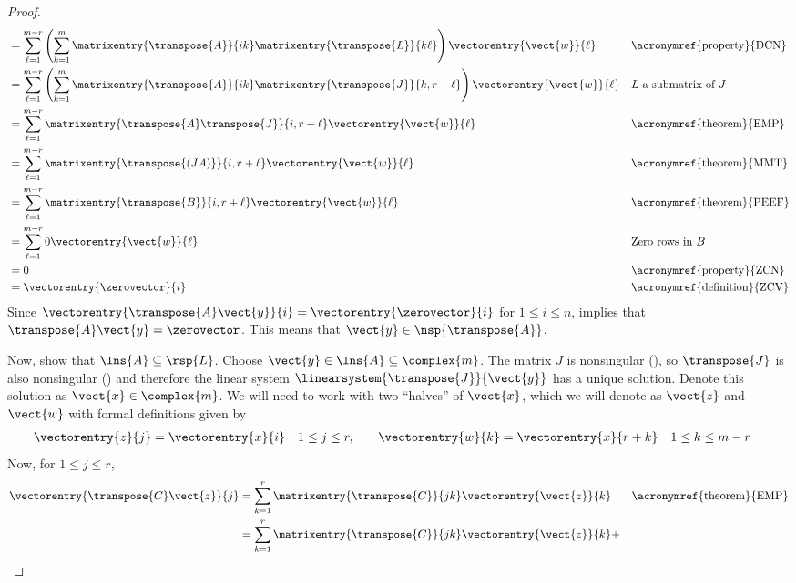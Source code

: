 \begin{proof}
\begin{align*}
%
&=\sum_{\ell=1}^{m-r}\left(\sum_{k=1}^{m}\matrixentry{\transpose{A}}{ik}\matrixentry{\transpose{L}}{k\ell}\right)\vectorentry{\vect{w}}{\ell}
&&\text{\acronymref{property}{DCN}}\\
%
&=\sum_{\ell=1}^{m-r}\left(\sum_{k=1}^{m}\matrixentry{\transpose{A}}{ik}\matrixentry{\transpose{J}}{k,r+\ell}\right)\vectorentry{\vect{w}}{\ell}
&&\text{$L$ a submatrix of $J$}\\
%
&=\sum_{\ell=1}^{m-r}\matrixentry{\transpose{A}\transpose{J}}{i,r+\ell}\vectorentry{\vect{w}}{\ell}
&&\text{\acronymref{theorem}{EMP}}\\
%
&=\sum_{\ell=1}^{m-r}\matrixentry{\transpose{\left(JA\right)}}{i,r+\ell}\vectorentry{\vect{w}}{\ell}
&&\text{\acronymref{theorem}{MMT}}\\
%
&=\sum_{\ell=1}^{m-r}\matrixentry{\transpose{B}}{i,r+\ell}\vectorentry{\vect{w}}{\ell}
&&\text{\acronymref{theorem}{PEEF}}\\
%
&=\sum_{\ell=1}^{m-r}0\vectorentry{\vect{w}}{\ell}
&&\text{Zero rows in $B$}\\
%
&=0
&&\text{\acronymref{property}{ZCN}}\\
%
&=\vectorentry{\zerovector}{i}
&&\text{\acronymref{definition}{ZCV}}
%
\end{align*}
%
Since $\vectorentry{\transpose{A}\vect{y}}{i}=\vectorentry{\zerovector}{i}$ for $1\leq i\leq n$,  implies that $\transpose{A}\vect{y}=\zerovector$.  This means that $\vect{y}\in\nsp{\transpose{A}}$.\par
%
Now, show that $\lns{A}\subseteq\rsp{L}$.  Choose $\vect{y}\in\lns{A}\subseteq\complex{m}$.  The matrix $J$ is nonsingular (), so $\transpose{J}$ is also nonsingular () and therefore the linear system $\linearsystem{\transpose{J}}{\vect{y}}$ has a unique solution.  Denote this solution as $\vect{x}\in\complex{m}$.  We will need to work with two ``halves'' of $\vect{x}$, which we will denote as $\vect{z}$ and $\vect{w}$ with formal definitions given by
%
\begin{align*}
\vectorentry{z}{j}&=\vectorentry{x}{i}
&
&1\leq j\leq r,
&&&
\vectorentry{w}{k}&=\vectorentry{x}{r+k}
&
&1\leq k\leq m-r
%
\end{align*}
%
Now, for $1\leq j\leq r$,
%
\begin{align*}
\vectorentry{\transpose{C}\vect{z}}{j}
%
&=\sum_{k=1}^{r}\matrixentry{\transpose{C}}{jk}\vectorentry{\vect{z}}{k}
&&\text{\acronymref{theorem}{EMP}}\\
%
&=\sum_{k=1}^{r}\matrixentry{\transpose{C}}{jk}\vectorentry{\vect{z}}{k}+

\end{align*}
\end{proof}
